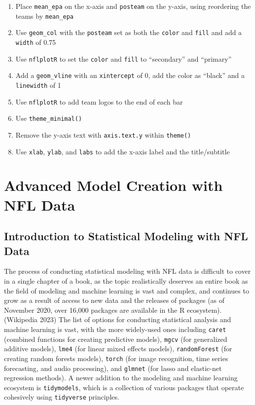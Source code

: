 \documentclass[
  letterpaper,
]{krantz}
\providecommand{\tightlist}{%
  \setlength{\itemsep}{0pt}\setlength{\parskip}{0pt}}\usepackage{longtable,booktabs,array}
\begin{document}
\begin{enumerate}
\def\labelenumi{\arabic{enumi}.}
\tightlist
\item
  Place \texttt{mean\_epa} on the x-axis and \texttt{posteam} on the
  y-axis, using reordering the teams by \texttt{mean\_epa}
\item
  Use \texttt{geom\_col} with the \texttt{posteam} set as both the
  \texttt{color} and \texttt{fill} and add a \texttt{width} of 0.75
\item
  Use \texttt{nflplotR} to set the \texttt{color} and \texttt{fill} to
  ``secondary'' and ``primary''
\item
  Add a \texttt{geom\_vline} with an \texttt{xintercept} of 0, add the
  color as ``black'' and a \texttt{linewidth} of 1
\item
  Use \texttt{nflplotR} to add team logos to the end of each bar
\item
  Use \texttt{theme\_minimal()}
\item
  Remove the y-axis text with \texttt{axis.text.y} within
  \texttt{theme()}
\item
  Use \texttt{xlab}, \texttt{ylab}, and \texttt{labs} to add the x-axis
  label and the title/subtitle
\end{enumerate}


\hypertarget{advanced-model-creation-with-nfl-data}{%
\chapter{Advanced Model Creation with NFL
Data}\label{advanced-model-creation-with-nfl-data}}

\hypertarget{introduction-to-statistical-modeling-with-nfl-data}{%
\section{Introduction to Statistical Modeling with NFL
Data}\label{introduction-to-statistical-modeling-with-nfl-data}}

The process of conducting statistical modeling with NFL data is
difficult to cover in a single chapter of a book, as the topic
realistically deserves an entire book as the field of modeling and
machine learning is vast and complex, and continues to grow as a result
of access to new data and the releases of packages (as of November 2020,
over 16,000 packages are available in the R ecosystem).(Wikipedia 2023)
The list of options for conducting statistical analysis and machine
learning is vast, with the more widely-used ones including
\texttt{caret} (combined functions for creating predictive models),
\texttt{mgcv} (for generalized additive models), \texttt{lme4} (for
linear mixed effects models), \texttt{randomForest} (for creating random
forests models), \texttt{torch} (for image recognition, time series
forecasting, and audio processing), and \texttt{glmnet} (for lasso and
elastic-net regression methods). A newer addition to the modeling and
machine learning ecosystem is \texttt{tidymodels}, which is a collection
of various packages that operate cohesively using \texttt{tidyverse}
principles.
\end{document}

